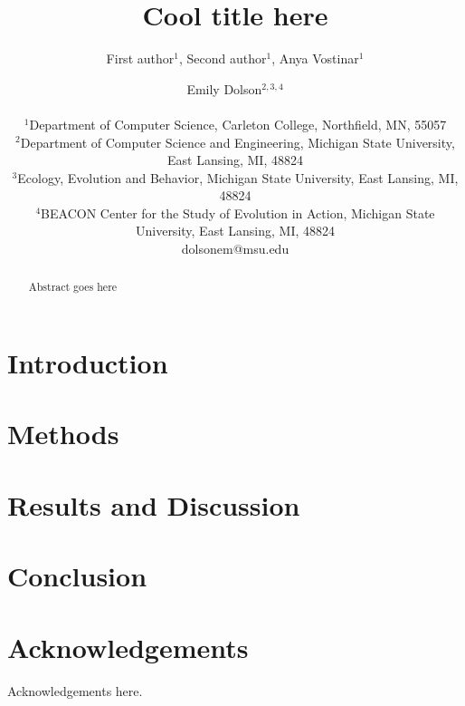 \documentclass[letterpaper]{article}
\title{Cool title here}
\author{First author$^{1}$, Second author$^{1}$, Anya Vostinar$^{1}$ \and Emily Dolson$^{2,3,4}$ \\
\mbox{}\\
$^1$Department of Computer Science, Carleton College, Northfield, MN, 55057 \\
$^2$Department of Computer Science and Engineering, Michigan State University, East Lansing, MI, 48824 \\
$^3$Ecology, Evolution and Behavior, Michigan State University, East Lansing, MI, 48824 \\
$^4$BEACON Center for the Study of Evolution in Action, Michigan State University, East Lansing, MI, 48824 \\
dolsonem@msu.edu} %
\begin{document}
\maketitle

\begin{abstract}
Abstract goes here
\end{abstract}

\section{Introduction}


\section{Methods}


\section{Results and Discussion}


\section{Conclusion}






\section{Acknowledgements}

Acknowledgements here.


\footnotesize

\end{document}
